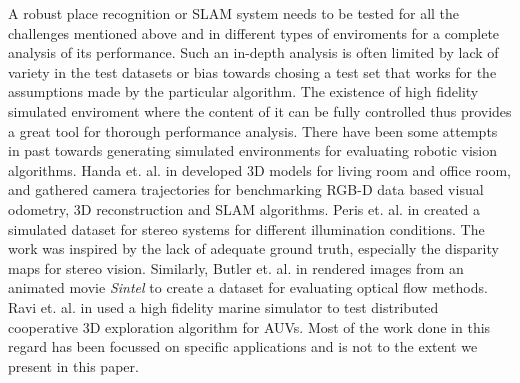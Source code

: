 A robust place recognition or SLAM system needs to be tested for all the challenges mentioned above and in different types of enviroments for a complete analysis of its performance. Such an in-depth analysis is often limited by lack of variety in the test datasets or bias towards chosing a test set that works for the assumptions made by the particular algorithm. The existence of high fidelity simulated enviroment where the content of it can be fully controlled thus provides a great tool for thorough performance analysis. There have been some attempts in past towards generating simulated environments for evaluating robotic vision algorithms. Handa et. al. in \cite{handa2014benchmark} developed 3D models for living room and office room, and gathered camera trajectories for benchmarking RGB-D data based visual odometry, 3D reconstruction and SLAM algorithms. Peris et. al. in \cite{peris2012towards} created a simulated dataset for stereo systems for different illumination conditions. The work was inspired by the lack of adequate ground truth, especially the disparity maps for stereo vision. Similarly, Butler et. al. in \cite{butler2012naturalistic} rendered images from an animated movie \emph{Sintel} to create a dataset for evaluating optical flow methods. Ravi et. al. in \cite{rathnam2013initial} used a high fidelity marine simulator to test distributed cooperative 3D exploration algorithm for AUVs. Most of the work done in this regard has been focussed on specific applications and is not to the extent we present in this paper.